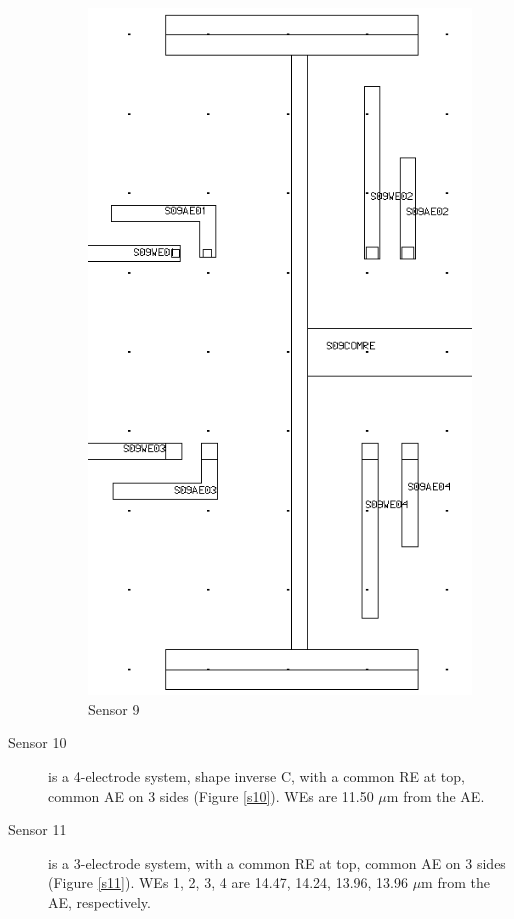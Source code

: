\begin{description}
\begin{figure}
\begin{minipage}{0.5\linewidth}
		\includegraphics[width=0.6\linewidth]{figures/s09.png}
		\caption{Sensor 9}
		\label{s09}
	\end{minipage}
\end{figure}

\item[Sensor 10] is a 4-electrode system, shape inverse C, with a common RE at top, common AE on 3 sides (Figure \ref{s10}). WEs are 11.50 $\mu \mathrm{m}$ from the AE.
\item[Sensor 11] is a 3-electrode system, with a common RE at top, common AE on 3 sides (Figure \ref{s11}). WEs 1, 2, 3, 4 are 14.47, 14.24, 13.96, 13.96 $\mu \mathrm{m}$ from the AE, respectively.


\end{description}
